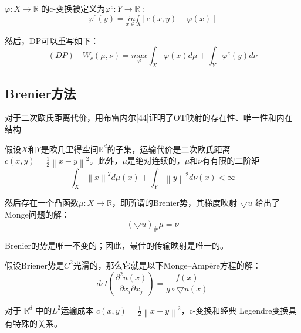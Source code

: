 \begin{definition}[c-转换]
	$\varphi: X\to \mathbb{R}$ 的c-变换被定义为$\varphi ^ c: Y \to \mathbb{R}$ :
	\begin{equation}
			\varphi ^c(y)= \underset{x \in X }{inf}\left [ c(x,y)-\varphi(x) \right ]
		\label{function:9}
	\end{equation}
	   
	然后，DP可以重写如下：
	\begin{equation}
		(DP) \quad W_c(\mu , \nu) = \underset{\varphi }{max} \int_X \varphi (x)d\mu +\int _Y \varphi ^c (y)d\nu
		\label{function:10}
	\end{equation}
	\label{definition:3.3}
\end{definition}

\subsection{Brenier方法}

对于二次欧氏距离代价，用布雷内尔[44]证明了OT映射的存在性、唯一性和内在结构
\begin{theorem}[Brenier【44】]
	假设$X$和$Y$是欧几里得空间$\mathbb{R}^d$的子集，运输代价是二次欧氏距离$c(x,y)=\frac{1}{2}\left \| x-y \right \| ^2 $。此外，$\mu$是绝对连续的，$\mu$和$\nu$有有限的二阶矩
	\begin{equation}
		\int _X \left \| x \right \| ^2 d\mu(x) + \int _Y \left \| y \right \| ^2 d\nu(x) < \infty 
		\label{function:11}
	\end{equation}
	
	然后存在一个凸函数$\mu : X \to \mathbb{R}$，即所谓的Brenier势，其梯度映射 $\bigtriangledown u$ 给出了Monge问题的解：
	\begin{equation}
		(\bigtriangledown u)_{\#} \mu = \nu
		\label{function:12}
	\end{equation}

	 Brenier的势是唯一不变的；因此，最佳的传输映射是唯一的。
	 
	 假设Briener势是$C^2$光滑的，那么它就是以下Monge–Ampère方程的解：
	 \begin{equation}
	 	det(\frac{\partial ^2 u(x)}{\partial x_i \partial x_j})=\frac{f(x)}{g \circ \bigtriangledown u(x)}
	 	\label{function:13}
	 \end{equation}
 
 	对于 $\mathbb{R}^d$ 中的$L^2$运输成本 $c(x,y)=\frac{1}{2} \left \| x-y \right \|^2  $，c-变换和经典 Legendre变换具有特殊的关系。
	\label{theorem:3.1}
\end{theorem}

